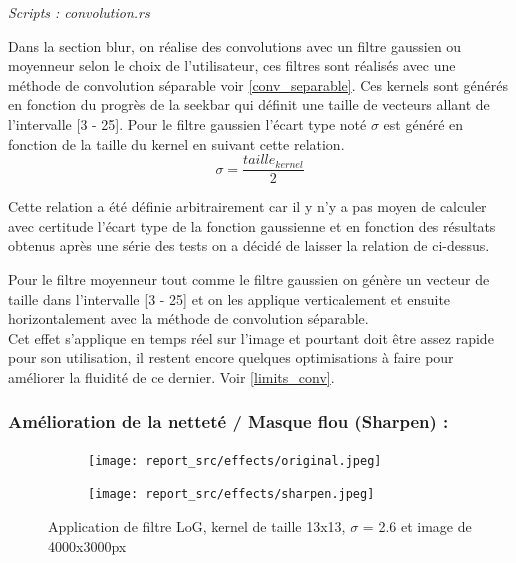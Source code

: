         \emph{Scripts : convolution.rs} 

        Dans la section blur, on réalise des convolutions avec un filtre gaussien ou moyenneur selon le choix de l'utilisateur,
        ces filtres sont réalisés avec une méthode de convolution séparable voir \ref{conv_separable}. Ces kernels sont générés en fonction du progrès de la seekbar qui
        définit une taille de vecteurs allant de l'intervalle [3 - 25]. Pour le filtre gaussien l'écart type noté $\sigma$ est généré en fonction de la taille du kernel en suivant
        cette relation.
        \[
            \sigma  =  \frac{taille_{kernel}}{2}            
        \]

        Cette relation a été définie arbitrairement car il y n'y a pas moyen de calculer avec certitude l'écart type de la fonction gaussienne et en fonction des résultats
        obtenus après une série des tests on a décidé de laisser la relation de ci-dessus.

        Pour le filtre moyenneur tout comme le filtre gaussien on génère un vecteur de taille dans l'intervalle [3 - 25] et on les applique verticalement et ensuite horizontalement
        avec la méthode de convolution séparable.
        \\
        
        Cet effet s'applique en temps réel sur l'image et pourtant doit être assez rapide pour son utilisation, il restent encore quelques optimisations à faire
        pour améliorer la fluidité de ce dernier. Voir \ref{limits_conv}.
        \\
        \newpage


    \subsubsection{Amélioration de la netteté / Masque flou (Sharpen) : } \label{sharpen}

        \begin{figure}[!h]
            \centering
            \begin{subfigure}[b]{0.4\textwidth}
                \texttt{[image: report\_src/effects/original.jpeg]}
            \end{subfigure}
            \begin{subfigure}[b]{0.4\textwidth}
                \texttt{[image: report\_src/effects/sharpen.jpeg]}
            \end{subfigure}
            \caption*{Application de filtre LoG, kernel de taille 13x13, $\sigma$ = 2.6 et image de 4000x3000px}
        \end{figure} 
        
